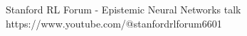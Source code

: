 \documentclass[preview]{standalone}
\begin{document}
Stanford RL Forum - Epistemic Neural Networks talk https://www.youtube.com/@stanfordrlforum6601\\
\end{document}
